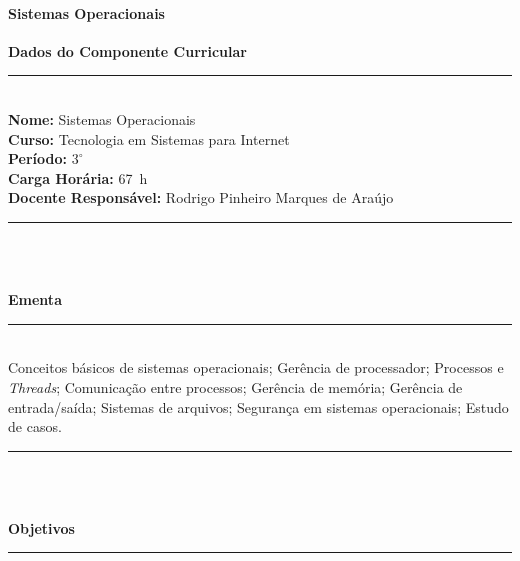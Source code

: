 \paragraph{Sistemas Operacionais}

\begin{center}\textbf{Dados do Componente Curricular}\end{center}
\vspace{-5mm}
\noindent\rule{16.5cm}{0.4pt}
\\
\textbf{Nome:} Sistemas Operacionais
\\ 
\textbf{Curso:} Tecnologia em Sistemas para Internet
\\ 
\textbf{Período:} $3^{\circ}$
\\ 
\textbf{Carga Horária:} 67~h
\\ 
\textbf{Docente Responsável:} Rodrigo Pinheiro Marques de Ara\'ujo
\\ 
\noindent\rule{16.5cm}{0.4pt}\\
\\
\vspace{-12mm}
\begin{center}\textbf{Ementa}\end{center}
\vspace{-5mm}
\noindent\rule{16.5cm}{0.4pt}
\\
Conceitos básicos de sistemas operacionais; Gerência de processador; Processos e \textit{Threads}; Comunicação entre processos; Gerência de memória; Gerência de entrada/saída; Sistemas de arquivos; Segurança em sistemas operacionais; Estudo de casos.\\ 
\noindent\rule{16.5cm}{0.4pt}\\
\\
\vspace{-12mm}
\begin{center}\textbf{Objetivos}\end{center}
\vspace{-5mm}
\noindent\rule{16.5cm}{0.4pt}
\\
